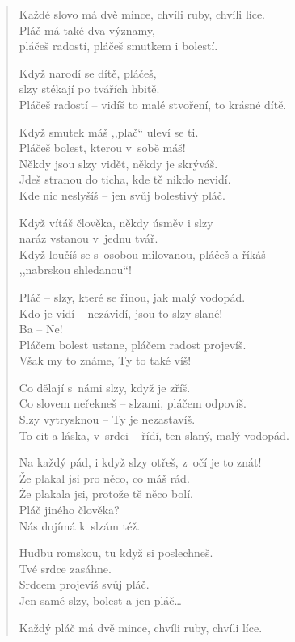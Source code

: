 \begin{verse}
Každé slovo má dvě mince, chvíli ruby, chvíli líce. \\
Pláč má také dva významy, \\
pláčeš radostí, pláčeš smutkem i bolestí.

\medskip

Když narodí se dítě, pláčeš, \\
\hspace{\fill}slzy stékají po tvářích hbitě. \\
Pláčeš radostí – vidíš to malé stvoření, to  krásné dítě.

\medskip

Když smutek máš ,,plač`` uleví se ti.  \\
Pláčeš bolest, kterou v sobě máš! \\
Někdy jsou slzy vidět, někdy je skrýváš. \\
Jdeš stranou do ticha, kde tě nikdo nevidí. \\
Kde nic neslyšíš -- jen svůj bolestivý pláč.

\medskip

Když vítáš člověka, někdy úsměv i slzy \\
\hspace{\fill}naráz vstanou v jednu tvář. \\
Když loučíš se  s osobou milovanou, pláčeš a říkáš \\
,,nabrskou shledanou``!

\medskip

Pláč -- slzy, které se řinou, jak malý vodopád. \\
Kdo je vidí -- nezávidí, jsou to slzy slané! \\
Ba – Ne! \\
Pláčem bolest ustane, pláčem radost projevíš. \\
Však my to známe, Ty to také víš!

\medskip

Co dělají s námi slzy, když je zříš. \\
Co slovem neřekneš -- slzami, pláčem odpovíš. \\
Slzy vytrysknou -- Ty je nezastavíš. \\ 
To cit a láska, v srdci -- řídí, ten slaný, malý vodopád.

\medskip

Na každý pád, i když slzy otřeš, z očí je to znát! \\
Že plakal jsi pro něco, co máš rád. \\
Že plakala jsi, protože tě něco bolí. \\
Pláč jiného člověka? \\
Nás dojímá k slzám též.

\medskip

Hudbu romskou, tu když si poslechneš. \\
Tvé srdce zasáhne. \\
Srdcem projevíš svůj pláč. \\
Jen samé slzy, bolest a jen pláč\ldots

\medskip

Každý pláč má dvě mince, chvíli ruby, chvíli líce.
\end{verse}

